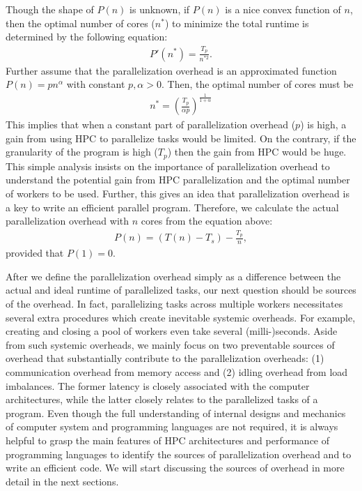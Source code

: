 \documentclass[12pt]{article}
\begin{document}
Though the shape of $P(n)$ is unknown, if $P(n)$ is a nice convex function of $n$, then the optimal number of cores ($n^*$) to minimize the total runtime is determined by the following equation: 
\begin{align*}
P'(n^*) = \frac{T_p}{n^{*2}}.
\end{align*}
Further assume that the parallelization overhead is an approximated function $P(n)=pn^\alpha$ with constant $p,\alpha>0$. Then, the optimal number of cores must be
\begin{align*}
n^* = \left(\frac{T_p}{\alpha p} \right)^{\frac{1}{1+\alpha}}
\end{align*}
This implies that when a constant part of parallelization overhead ($p$) is high, a gain from using HPC to parallelize tasks would be limited. On the contrary, if the granularity of the program is high ($T_p$) then the gain from HPC would be huge. This simple analysis insists on the importance of parallelization overhead to understand the potential gain from HPC parallelization and the optimal number of workers to be used. Further, this gives an idea that parallelization overhead is a key to write an efficient parallel program. Therefore, we calculate the actual parallelization overhead with $n$ cores from the equation above:
\begin{align*}
P(n) = (T(n)-T_s) - \frac{T_p}{n},
\end{align*}
provided that $P(1)=0$.

After we define the parallelization overhead simply as a difference between the actual and ideal runtime of parallelized tasks, our next question should be sources of the overhead. In fact, parallelizing tasks across multiple workers necessitates several extra procedures which create inevitable systemic overheads. For example, creating and closing a pool of workers even take several (milli-)seconds. Aside from such systemic overheads, we mainly focus on two preventable sources of overhead that substantially contribute to the parallelization overheads: (1) communication overhead from memory access and (2) idling overhead from load imbalances. The former latency is closely associated with the computer architectures, while the latter closely relates to the parallelized tasks of a program. Even though the full understanding of internal designs and mechanics of computer system and programming languages are not required, it is always helpful to grasp the main features of HPC architectures and performance of programming languages to identify the sources of parallelization overhead and to write an efficient code. We will start discussing the sources of overhead in more detail in the next sections.
\end{document}
